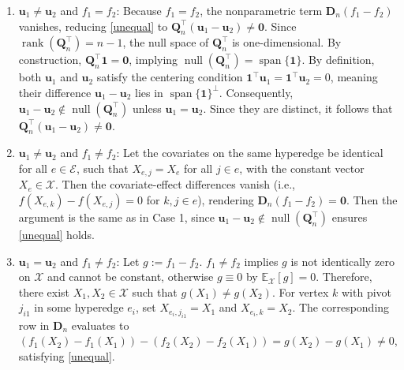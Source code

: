 \documentclass[
  12pt]{article}
\begin{document}
\begin{enumerate}
    \item \(\boldsymbol{u}_1 \neq \boldsymbol{u}_2\) and \(f_1 = f_2\): 
    Because \(f_1 = f_2\), the nonparametric term \(\boldsymbol{D}_n(f_1-f_2)\) vanishes, reducing \eqref{unequal} to \(\boldsymbol{Q}_n^\top(\boldsymbol{u}_1-\boldsymbol{u}_2) \neq \boldsymbol{0}\). Since \(\operatorname{rank}(\boldsymbol{Q}_n^{\top}) = n-1\), the null space of \(\boldsymbol{Q}_n^{\top}\) is one-dimensional. By construction, \(\boldsymbol{Q}_n^{\top} \mathbf{1} = \mathbf{0}\), implying \(\operatorname{null}(\boldsymbol{Q}_n^{\top}) = \operatorname{span}\{\mathbf{1}\}\). By definition, both \(\boldsymbol{u}_1\) and \(\boldsymbol{u}_2\) satisfy the centering condition \(\mathbf{1}^{\top} \boldsymbol{u}_1 = \mathbf{1}^{\top} \boldsymbol{u}_2 = 0\), meaning their difference \(\boldsymbol{u}_1-\boldsymbol{u}_2\) lies in \(\operatorname{span}\{\mathbf{1}\}^{\perp}\). Consequently, \(\boldsymbol{u}_1-\boldsymbol{u}_2 \notin \operatorname{null}(\boldsymbol{Q}_n^{\top})\) unless \(\boldsymbol{u}_1 = \boldsymbol{u}_2\). Since they are distinct, it follows that \(\boldsymbol{Q}_n^{\top}(\boldsymbol{u}_1-\boldsymbol{u}_2) \neq \mathbf{0}\).

    \item \(\boldsymbol{u}_1 \neq \boldsymbol{u}_2\) and \(f_1 \neq f_2\): 
    Let the covariates on the same hyperedge be identical for all $e \in \mathcal{E}$, such that $X_{e, j} = X_e $ for all $j \in e$, with the constant vector $X_e \in \mathcal{X}$. Then the covariate-effect differences vanish (i.e., \(f(X_{e, k}) - f(X_{e, j}) = 0\) for $k,j \in e$), rendering \(\boldsymbol{D}_n(f_1-f_2) = \boldsymbol{0}\). Then the argument is the same as in Case 1, since \(\boldsymbol{u}_1-\boldsymbol{u}_2 \notin \operatorname{null}(\boldsymbol{Q}_n^{\top})\) ensures \eqref{unequal} holds.

    \item$\boldsymbol{u}_1 = \boldsymbol{u}_2$ and $f_1 \neq f_2$: Let $g:=f_1-f_2$. $f_1 \neq f_2$ implies $g$ is not identically zero on $\mathcal{X}$ and cannot be constant, otherwise $g \equiv 0$ by $\mathbb{E}_{\mathcal{X}}[g]=0$. Therefore, there exist $X_1, X_2 \in \mathcal{X}$ such
that $g(X_1) \neq g(X_2)$. For vertex $k$ with pivot
$j_{i1}$ in some hyperedge \(e_i\), set \(X_{e_i, j_{i1}} = X_1\) and
\(X_{e_i, k} = X_2\). The corresponding row in \(\boldsymbol{D}_n\) evaluates
to
\((f_1(X_2) - f_1(X_1)) - (f_2(X_2) - f_2(X_1))
  = g(X_2) - g(X_1) \neq 0\),
satisfying \eqref{unequal}.
\end{enumerate}
\end{document}
